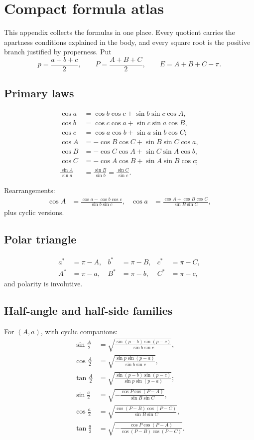 \appendix
\section{Compact formula atlas}
\label{app:atlas}

This appendix collects the formulas in one place.  Every quotient carries the
apartness conditions explained in the body, and every square root is the
positive branch justified by properness.  Put
\[
 p=\frac{a+b+c}{2},\qquad P=\frac{A+B+C}{2},\qquad
 E=A+B+C-\pi.
\]

\subsection{Primary laws}

\begin{align*}
\cos a&=\cos b\cos c+\sin b\sin c\cos A,\\
\cos b&=\cos c\cos a+\sin c\sin a\cos B,\\
\cos c&=\cos a\cos b+\sin a\sin b\cos C;\\[0.3em]
\cos A&=-\cos B\cos C+\sin B\sin C\cos a,\\
\cos B&=-\cos C\cos A+\sin C\sin A\cos b,\\
\cos C&=-\cos A\cos B+\sin A\sin B\cos c;\\[0.3em]
\frac{\sin A}{\sin a}&=
\frac{\sin B}{\sin b}=
\frac{\sin C}{\sin c}.
\end{align*}

Rearrangements:
\begin{align*}
\cos A&=\frac{\cos a-\cos b\cos c}{\sin b\sin c},&
\cos a&=\frac{\cos A+\cos B\cos C}{\sin B\sin C},
\end{align*}
plus cyclic versions.

\subsection{Polar triangle}

\begin{align*}
a^*&=\pi-A,&b^*&=\pi-B,&c^*&=\pi-C,\\
A^*&=\pi-a,&B^*&=\pi-b,&C^*&=\pi-c,
\end{align*}
and polarity is involutive.

\subsection{Half-angle and half-side families}

For \((A,a)\), with cyclic companions:
\begin{align*}
\sin\frac A2&=\sqrt{\frac{\sin(p-b)\sin(p-c)}{\sin b\sin c}},\\
\cos\frac A2&=\sqrt{\frac{\sin p\sin(p-a)}{\sin b\sin c}},\\
\tan\frac A2&=\sqrt{\frac{\sin(p-b)\sin(p-c)}{\sin p\sin(p-a)}};\\[0.4em]
\sin\frac a2&=\sqrt{-\frac{\cos P\cos(P-A)}{\sin B\sin C}},\\
\cos\frac a2&=\sqrt{\frac{\cos(P-B)\cos(P-C)}{\sin B\sin C}},\\
\tan\frac a2&=\sqrt{-\frac{\cos P\cos(P-A)}{\cos(P-B)\cos(P-C)}}.
\end{align*}

